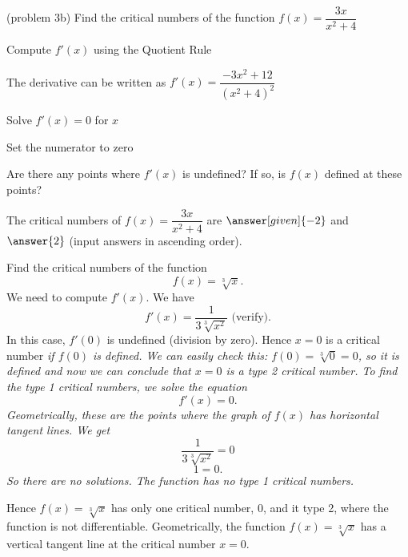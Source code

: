 \documentclass{ximera}
\begin{document}
\begin{problem}(problem 3b)
  Find the critical numbers of the function $f(x) = \dfrac{3x}{x^2 +4}$
  
  
    \begin{hint}
      Compute $f'(x)$ using the Quotient Rule
    \end{hint}
    \begin{hint}
      The derivative can be written as $f'(x) = \dfrac{-3x^2 + 12}{(x^2 + 4)^2}$
    \end{hint}
		\begin{hint}
      Solve $f'(x) = 0$ for $x$
    \end{hint}
		\begin{hint}
      Set the numerator to zero
    \end{hint}
    \begin{hint}
      Are there any points where $f'(x)$ is undefined?
      If so, is $f(x)$ defined at these points?  
		\end{hint}
    
    
		The critical numbers of $f(x) = \dfrac{3x}{x^2 + 4}$ are
		 $\answer[given]{-2}$ and $\answer{2}$ 
		(input answers in ascending order).
	
\end{problem}




\begin{example}[example 4] Find the critical numbers of the function 
\[f(x) = \sqrt[3] x.\]
We need to compute $f'(x)$.  We have
\[f'(x) = \frac{1}{3\sqrt[3]{x^2}} \text{   (verify)}.\]
In this case, $f'(0)$ is undefined (division by zero). Hence $x=0$ is a critical number \it{if}
$f(0)$ is defined.  We can easily check this: $f(0) = \sqrt[3] 0 = 0$, so it is defined and now we can conclude 
that $x=0$ is a type 2 critical number.
To find the type 1 critical numbers, we solve the equation
\[f'(x) = 0.\]
Geometrically, these are the points where the graph of $f(x)$ has horizontal tangent lines.
We get
\[ \frac{1}{3\sqrt[3]{x^2}} =0\]
\[ 1 =0.\]
So there are no solutions.  The function has no type 1 critical numbers.


Hence $f(x) = \sqrt[3] x$ has only one critical number, 0, and it type 2, 
where the function is not differentiable. 
Geometrically, the function $f(x) = \sqrt[3] x$ has a vertical tangent line at the critical number $x = 0$.
\end{example}
\end{document}
